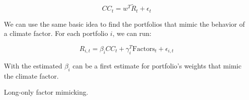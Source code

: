 \begin{equation}
    CC_t = w^T \tilde{R}_t + \epsilon_t 
\end{equation}

We can use the same basic idea to find the portfolios 
that mimic the behavior of a climate factor. For each portfolio $i$, we can run:

\begin{equation}
    R_{i,t} = \beta_i CC_t + \gamma_i^T \text{Factors}_t + \epsilon_{i,t}
\end{equation}

With the estimated $\beta_i$ can be a first 
estimate for portfolio's weights that 
mimic the climate factor.

Long-only factor mimicking.
